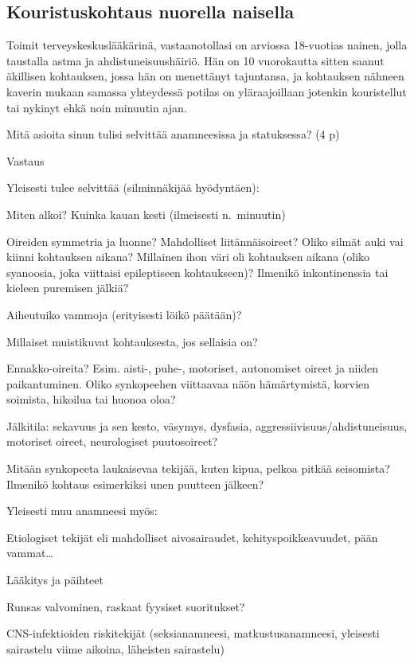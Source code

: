 \documentclass[
]{book}
\begin{document}
\subsection{Kouristuskohtaus nuorella naisella}\label{kouristuskohtaus-nuorella-naisella}

Toimit terveyskeskuslääkärinä, vastaanotollasi on arviossa 18-vuotias nainen, jolla taustalla astma ja ahdistuneisuushäiriö. Hän on 10 vuorokautta sitten saanut äkillisen
kohtauksen, jossa hän on menettänyt tajuntansa, ja kohtauksen nähneen kaverin mukaan samassa yhteydessä potilas on yläraajoillaan jotenkin kouristellut tai nykinyt ehkä noin minuutin ajan.

Mitä asioita sinun tulisi selvittää anamneesissa ja statuksessa? (4 p)

Vastaus

Yleisesti tulee selvittää (silminnäkijää hyödyntäen):

Miten alkoi? Kuinka kauan kesti (ilmeisesti n.~minuutin)

Oireiden symmetria ja luonne? Mahdolliset liitännäisoireet? Oliko silmät auki vai kiinni kohtauksen aikana? Millainen ihon väri oli kohtauksen aikana (oliko syanoosia, joka viittaisi epileptiseen kohtaukseen)? Ilmenikö inkontinenssia tai kieleen puremisen jälkiä?

Aiheutuiko vammoja (erityisesti löikö päätään)?

Millaiset muistikuvat kohtauksesta, jos sellaisia on?

Ennakko-oireita? Esim. aisti-, puhe-, motoriset, autonomiset oireet ja niiden paikantuminen. Oliko synkopeehen viittaavaa näön hämärtymistä, korvien soimista, hikoilua tai huonoa oloa?

Jälkitila: sekavuus ja sen kesto, väsymys, dysfasia, aggressiivisuus/ahdistuneisuus, motoriset oireet, neurologiset puutosoireet?

Mitään synkopeeta laukaisevaa tekijää, kuten kipua, pelkoa pitkää seisomista? Ilmenikö kohtaus esimerkiksi unen puutteen jälkeen?

Yleisesti muu anamneesi myös:

Etiologiset tekijät eli mahdolliset aivosairaudet, kehityspoikkeavuudet, pään vammat\ldots{}

Lääkitys ja päihteet

Runsas valvominen, raskaat fyysiset suoritukset?

CNS-infektioiden riskitekijät (seksianamneesi, matkustusanamneesi, yleisesti sairastelu viime aikoina, läheisten sairastelu)
\end{document}
